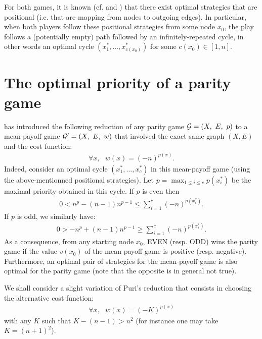 \documentclass{article}
\def\G{{\cal G}}
\begin{document}
For both games, it is known (cf. \citet{zielonka98} and \citet{ehrenfeucht79}) that there exist optimal strategies that are positional (i.e. that are mapping from nodes to outgoing edges). In particular, when both players follow these positional strategies from some node $x_0$, the play follows a (potentially empty) path followed by an infinitely-repeated cycle, in other words an optimal cycle $(x^*_1,\dots,x^*_{c(x_0)})$ for some $c(x_0) \in [1,n]$.

\section{The optimal priority of a parity game}

\citet{puri96} has introduced the following reduction of any parity game $\G=(X, ~E,~ p)$ to a mean-payoff game $\G'=(X,~ E,~ w)$ that involved the exact same graph $(X,E)$ and the cost function:
\begin{align}
  \forall x,~~~ w(x) = (-n)^{p(x)}.
\end{align}
Indeed, consider an optimal cycle $(x^*_1,\dots,x^*_c)$ in this mean-payoff game (using the above-mentionned positional strategies). Let $p=\max_{1 \le i \le c} p(x^*_i)$ be the maximal priority obtained in this cycle. If $p$ is even then
\begin{align}
 0 <  n^{p} - (n-1) n^{p-1} \le  \sum_{i=1}^{c} (-n)^{p(x^*_i)}.
\end{align}
If $p$ is odd, we similarly have:
\begin{align}
0 > -n^{p} + (n-1) n^{p-1} \ge   \sum_{i=1}^{c} (-n)^{p(x^*_i)}.
\end{align}
As a consequence, from any starting node $x_0$, EVEN (resp. ODD) wins the parity game if the value $v(x_0)$ of the mean-payoff game  is positive (resp. negative). Furthermore, an optimal pair of strategies for the mean-payoff game is also optimal for the parity game (note that the opposite is in general not true).

We shall consider a slight variation of Puri's reduction that consists in choosing the alternative cost function:
\begin{align}
  \forall x,~~~ w(x) = (-K)^{p(x)}
\end{align}
with any $K$ such that $K-(n-1) > n^2$
(for instance one may take $K=(n+1)^2$).
\end{document}
